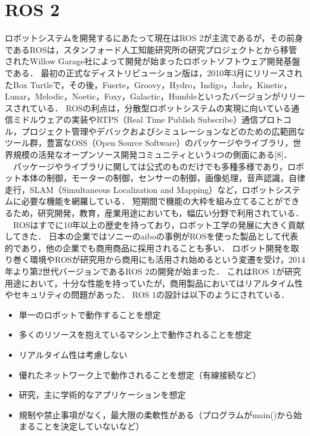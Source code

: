 \section{ROS 2}
ロボットシステムを開発するにあたって現在はROS 2が主流であるが，その前身であるROSは，スタンフォード人工知能研究所の研究プロジェクトとから移管されたWillow Garage社によって開発が始まったロボットソフトウェア開発基盤である．
最初の正式なディストリビューション版は，2010年3月にリリースされたBox Turtleで，その後，Fuerte，Groovy，Hydro，Indigo，Jade，Kinetic，Lunar，Melodic，Noetic，Foxy，Galactic，Humbleといったバージョンがリリースされている．
ROSの利点は，分散型ロボットシステムの実現に向いている通信ミドルウェアの実装やRTPS（Real Time Publish Subscribe）通信プロトコル，プロジェクト管理やデバックおよびシミュレーションなどのための広範囲なツール群，豊富なOSS（Open Source Software）のパッケージやライブラリ，世界規模の活発なオープンソース開発コミュニティという4つの側面にある[8]．\\
　パッケージやライブラリに関しては公式のものだけでも多種多様であり，ロボット本体の制御，モーターの制御，センサーの制御，画像処理，音声認識，自律走行，SLAM（Simultaneous Localization and Mapping）など，ロボットシステムに必要な機能を網羅している．
短期間で機能の大枠を組み立てることができるため，研究開発，教育，産業用途においても，幅広い分野で利用されている．\\
　ROSはすでに10年以上の歴史を持っており，ロボット工学の発展に大きく貢献してきた．
日本の企業ではソニーのaiboの事例がROSを使った製品として代表的であり，他の企業でも商用商品に採用されることも多い．
ロボット開発を取り巻く環境やROSが研究用から商用にも活用され始めるという変遷を受け，2014年より第2世代バージョンであるROS 2の開発が始まった．
これはROS 1が研究用途において，十分な性能を持っていたが，商用製品においてはリアルタイム性やセキュリティの問題があった．
ROS 1の設計は以下のようにされている．
    \begin{itemize}
        \item 単一のロボットで動作することを想定
        \item 多くのリソースを抱えているマシン上で動作されることを想定
        \item リアルタイム性は考慮しない
        \item 優れたネットワーク上で動作されることを想定（有線接続など）
        \item 研究，主に学術的なアプリケーションを想定
        \item 規制や禁止事項がなく，最大限の柔軟性がある（プログラムがmain()から始まることを決定していないなど）
    \end{itemize}
